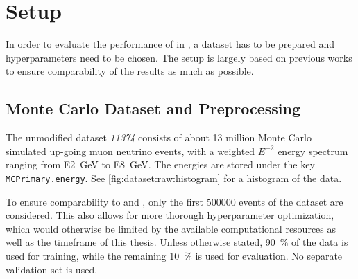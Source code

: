 \section{Setup}
In order to evaluate the performance of \corn{} in \dsea{},
a dataset has to be prepared
and hyperparameters need to be chosen.
%
The setup is largely based on previous works
  \cite{dsea_jan, dsea_samuel}
to ensure comparability of the results
  as much as possible.


\subsection{Monte Carlo Dataset and Preprocessing}
%
%
The unmodified dataset \emph{11374} \cite{icecube_mc} consists of about 13 million Monte Carlo simulated
  \hyperref[sec:neutrino_astronomy:icecube:up_going]{up-going}
  muon neutrino events,
with a weighted $E^{-2}$ energy spectrum
ranging from \SI{E2}{\giga\electronvolt} to \SI{E8}{\giga\electronvolt}.
The energies are stored under the key \texttt{MCPrimary.energy}.
See \autoref{fig:dataset:raw:histogram} for a histogram of the data.

To ensure comparability to \cite{dsea_jan} and \cite{dsea_samuel}, %
only the first \num{500000} events of the dataset are considered.
This also allows for more thorough hyperparameter optimization,
which would otherwise be limited by
  the available computational resources
  as well as the timeframe of this thesis.
%
Unless otherwise stated, %
\SI{90}{\percent} of the data is used for training,
while the remaining \SI{10}{\percent} is used for evaluation.
No separate validation set is used.


